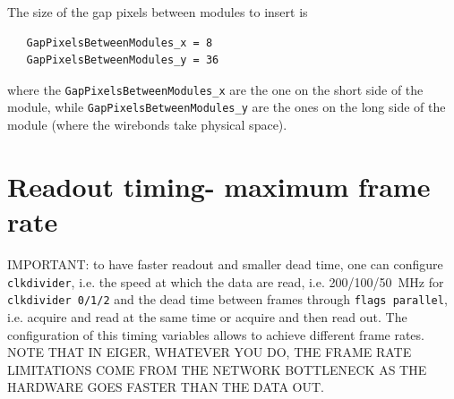 \documentclass{article}
\begin{document}
The size of the gap pixels between modules to insert is 
\begin{verbatim}
   GapPixelsBetweenModules_x = 8
   GapPixelsBetweenModules_y = 36
\end{verbatim}
where the {\tt{GapPixelsBetweenModules\_x}} are the one on the short side of the module, while {\tt{GapPixelsBetweenModules\_y}} are the ones on the long side of the module (where the wirebonds take physical space).
  
\section{Readout timing- maximum frame rate}\label{timing}
IMPORTANT: to have faster readout and smaller dead time, one can configure {\tt{clkdivider}}, i.e. the speed at which the data are read, i.e. 200/100/50~MHz for {\tt{clkdivider 0/1/2}} and the dead time between frames through {\tt{flags parallel}}, i.e. acquire and read at the same time or acquire and then read out.
The configuration of this timing variables allows to achieve different frame rates. NOTE THAT IN EIGER, WHATEVER YOU DO, THE FRAME RATE LIMITATIONS COME FROM THE NETWORK BOTTLENECK AS THE HARDWARE GOES FASTER THAN THE DATA OUT.
\end{document}
